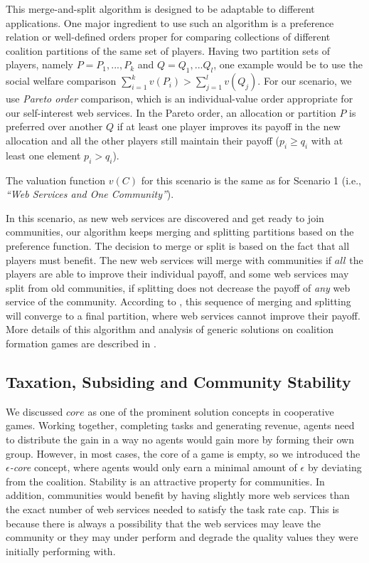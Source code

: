 \documentclass[10pt,journal,cspaper,compsoc]{IEEEtran}
\begin{document}
This merge-and-split algorithm is designed to be adaptable to
different applications. One major ingredient to use such an
algorithm is a preference relation or well-defined orders proper
for comparing collections of different coalition partitions of the
same set of players. Having two partition sets of players, namely
$P = {P_1,...,P_k}$ and $Q = {Q_1,...Q_l}$, one example would be
to use the social welfare comparison $\sum^k_{i=1}v(P_i) >
\sum^l_{j=1}v(Q_j)$. For our scenario, we use \emph{Pareto order}
comparison, which is an individual-value order appropriate for our
self-interest web services. In the Pareto order, an allocation or
partition $P$ is preferred over another $Q$ if at least one player
improves its payoff in the new allocation and all the other
players still maintain their payoff ($p_i \geq q_i$ with at least
one element $p_i > q_i$).

The valuation function $v(C)$ for this scenario is the same as for
Scenario 1 (i.e., \emph{``Web Services and One Community''}).

In this scenario, as new web services are discovered and get ready
to join communities, our algorithm keeps merging and splitting
partitions based on the preference function. The decision to merge
or split is based on the fact that all players must benefit. The
new web services will merge with communities if $all$ the players
are able to improve their individual payoff, and some web services
may split from old communities, if splitting does not decrease the
payoff of \emph{any} web service of the community. According to
\cite{DBLP:journals/corr/abs-cs-0605132}, this sequence of merging
and splitting will converge to a final partition, where web
services cannot improve their payoff. More details of this
algorithm and analysis of generic solutions on coalition formation
games are described in \cite{DBLP:journals/igtr/AptW09}.

\subsection{Taxation, Subsiding and Community Stability}\label{s:tax}

We discussed $core$ as one of the prominent solution concepts in
cooperative games. Working together, completing tasks and
generating revenue, agents need to distribute the gain in a way no
agents would gain more by forming their own group. However, in
most cases, the core of a game is empty, so we introduced the
\emph{$\epsilon$-core} concept, where agents would only earn a
minimal amount of $\epsilon$ by deviating from the coalition.
Stability is an attractive property for communities. In addition,
communities would benefit by having slightly more web services
than the exact number of web services needed to satisfy the task
rate cap. This is because there is always a possibility that the
web services may leave the community or they may under perform and
degrade the quality values they were initially performing with.
\end{document}
